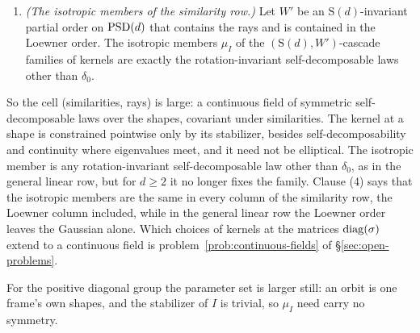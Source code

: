 \begin{proposition}
\begin{enumerate}
$\mu_{sI} = (\sqrt s\,I)_*\mu_I$ for $s \ge 0$, and $\mu_I$ is rotation invariant, self-decomposable and
not $\delta_0$. Conversely, let $\mu_I$ be such a law. Then (i) $\Sigma \mapsto (\Sigma^{1/2})_*\mu_I$ and
(ii) $\Sigma \mapsto \nu_\Sigma := ((\det\Sigma)^{1/(2d)}I)_*\mu_I$ are the kernels from scale zero of
$(\mathrm S(d), W)$-cascade families with isotropic member $\mu_I$, and (ii) is also the family of kernels
from scale zero of an $(\mathrm S(d), \text{Loewner})$-cascade family. For $d \ge 2$ the two differ at
every $\Sigma \in \PD(d)$ that is not a multiple of $I$.
\item \emph{(The isotropic members of the similarity row.)} Let $W'$ be an $\mathrm S(d)$-invariant
partial order on $\mathrm{PSD}(d)$ that contains the rays and is contained in the Loewner order. The isotropic
members $\mu_I$ of the $(\mathrm S(d), W')$-cascade families of kernels are exactly the rotation-invariant
self-decomposable laws other than $\delta_0$.
\end{enumerate}
\end{proposition}

So the cell (similarities, rays) is large: a continuous field of symmetric self-decomposable laws over
the shapes, covariant under similarities. The kernel at a shape is constrained pointwise only by its
stabilizer, besides self-decomposability and continuity where eigenvalues meet, and it need not be
elliptical. The isotropic member is any rotation-invariant self-decomposable law other than $\delta_0$,
as in the general linear row, but for $d \ge 2$ it no longer fixes the family. Clause (4) says that the
isotropic members are the same in every column of the similarity row, the Loewner column included,
while in the general linear row the Loewner order leaves the Gaussian alone. Which choices of kernels at
the matrices $\operatorname{diag}(\sigma)$ extend to a continuous field is problem~\ref{prob:continuous-fields} of
\S\ref{sec:open-problems}.

For the positive diagonal group the parameter set is larger still: an orbit is one frame's own
shapes, and the stabilizer of $I$ is trivial, so $\mu_I$ need carry no symmetry.

